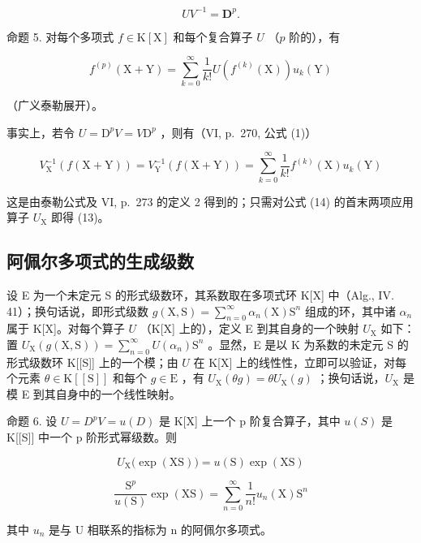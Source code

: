\[
U V ^ {- 1} = \mathbf {D} ^ {p}.\tag{12}
\]

命题 5. 对每个多项式 \(f \in \mathrm{K}[\mathrm{X}]\) 和每个复合算子 \(U\) （\(p\) 阶的），有

\[
f ^ {(p)} (\mathrm{X} + \mathrm{Y}) = \sum_ {k = 0} ^ {\infty} \frac {1}{k !} U (f ^ {(k)} (\mathrm{X})) u _ {k} (\mathrm{Y})\tag{13}
\]

（广义泰勒展开）。

事实上，若令 \(U = \mathrm{D}^p V = V\mathrm{D}^p\) ，则有（VI, p.~270, 公式 (1)）

\[
V _ {\mathrm{X}} ^ {- 1} (f (\mathrm{X} + \mathrm{Y})) = V _ {\mathrm{Y}} ^ {- 1} (f (\mathrm{X} + \mathrm{Y})) = \sum_ {k = 0} ^ {\infty} \frac {1}{k !} f ^ {(k)} (\mathrm{X}) u _ {k} (\mathrm{Y})\tag{14}
\]

这是由泰勒公式及 VI, p.~273 的定义 2 得到的；只需对公式 (14) 的首末两项应用算子 \(U_{\mathrm{X}}\) 即得 (13)。

\subsection{阿佩尔多项式的生成级数}

设 E 为一个未定元 S 的形式级数环，其系数取在多项式环 K{[}X{]} 中（Alg., IV. 41）；换句话说，即形式级数 \(g(\mathrm{X}, \mathrm{S}) = \sum_{n=0}^{\infty} \alpha_n(\mathrm{X}) \mathrm{S}^n\) 组成的环，其中诸 \(\alpha_n\) 属于 K{[}X{]}。对每个算子 \(U\) （K{[}X{]} 上的），定义 E 到其自身的一个映射 \(U_{\mathrm{X}}\) 如下：置 \(U_{\mathrm{X}}(g(\mathrm{X}, \mathrm{S})) = \sum_{n=0}^{\infty} U(\alpha_n)\mathrm{S}^n\) 。显然，E 是以 K 为系数的未定元 S 的形式级数环 K{[}{[}S{]}{]} 上的一个模；由 \(U\) 在 K{[}X{]} 上的线性性，立即可以验证，对每个元素 \(\theta \in \mathrm{K}[[\mathrm{S}]]\) 和每个 \(g \in \mathrm{E}\) ，有 \(U_{\mathrm{X}}(\theta g) = \theta U_{\mathrm{X}}(g)\) ；换句话说，\(U_{\mathrm{X}}\) 是模 E 到其自身中的一个线性映射。

命题 6. 设 \(U = D^{p}V = u(D)\) 是 K{[}X{]} 上一个 p 阶复合算子，其中 \(u(S)\) 是 K{[}{[}S{]}{]} 中一个 p 阶形式幂级数。则

\[
U _ {\mathrm{X}} \big (\exp (\mathrm{XS}) \big) = u (\mathrm{S}) \exp (\mathrm{XS})\tag{15}
\]

\[
\frac {\mathrm{S} ^ {p}}{u (\mathrm{S})} \exp (\mathrm{XS}) = \sum_ {n = 0} ^ {\infty} \frac {1}{n !} u _ {n} (\mathrm{X}) \mathrm{S} ^ {n}\tag{16}
\]

其中 \(u_{n}\) 是与 U 相联系的指标为 n 的阿佩尔多项式。

